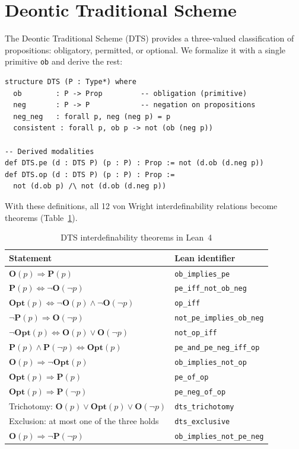 \documentclass[]{article}
\newcommand{\code}[1]{\texttt{#1}}
\newcommand{\OB}{\ensuremath{\mathbf{O}}}
\newcommand{\PE}{\ensuremath{\mathbf{P}}}
\newcommand{\OP}{\ensuremath{\mathbf{Opt}}}
\newcommand{\DTS}{\textup{DTS}}
\begin{document}
\section{Deontic Traditional Scheme}
\label{sec:dts}

The Deontic Traditional Scheme (\DTS{}) \cite{AlchourrónBulygin1971,vonWright1951}
provides a three-valued classification of propositions: obligatory, permitted,
or optional.
We formalize it with a single primitive \code{ob} and derive the rest:

\begin{lstlisting}
structure DTS (P : Type*) where
  ob        : P -> Prop         -- obligation (primitive)
  neg       : P -> P            -- negation on propositions
  neg_neg   : forall p, neg (neg p) = p
  consistent : forall p, ob p -> not (ob (neg p))

-- Derived modalities
def DTS.pe (d : DTS P) (p : P) : Prop := not (d.ob (d.neg p))
def DTS.op (d : DTS P) (p : P) : Prop :=
  not (d.ob p) /\ not (d.ob (d.neg p))
\end{lstlisting}

\noindent
With these definitions, all 12 von Wright interdefinability relations become
theorems (Table~\ref{tab:dts}).

\begin{longtable}{ll}
\caption{DTS interdefinability theorems in Lean~4}\label{tab:dts}\\
\textbf{Statement} & \textbf{Lean identifier} \\
\hline
$\OB(p) \Rightarrow \PE(p)$ & \code{ob\_implies\_pe} \\
$\PE(p) \Leftrightarrow \neg\OB(\neg p)$ & \code{pe\_iff\_not\_ob\_neg} \\
$\OP(p) \Leftrightarrow \neg\OB(p) \wedge \neg\OB(\neg p)$ & \code{op\_iff} \\
$\neg\PE(p) \Rightarrow \OB(\neg p)$ & \code{not\_pe\_implies\_ob\_neg} \\
$\neg\OP(p) \Leftrightarrow \OB(p) \vee \OB(\neg p)$ & \code{not\_op\_iff} \\
$\PE(p) \wedge \PE(\neg p) \Leftrightarrow \OP(p)$ & \code{pe\_and\_pe\_neg\_iff\_op} \\
$\OB(p) \Rightarrow \neg\OP(p)$ & \code{ob\_implies\_not\_op} \\
$\OP(p) \Rightarrow \PE(p)$ & \code{pe\_of\_op} \\
$\OP(p) \Rightarrow \PE(\neg p)$ & \code{pe\_neg\_of\_op} \\
Trichotomy: $\OB(p) \vee \OP(p) \vee \OB(\neg p)$ & \code{dts\_trichotomy} \\
Exclusion: at most one of the three holds & \code{dts\_exclusive} \\
$\OB(p) \Rightarrow \neg\PE(\neg p)$ & \code{ob\_implies\_not\_pe\_neg} \\
\hline
\end{longtable}
\end{document}
